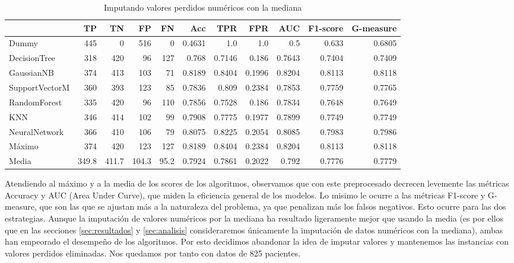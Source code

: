 \documentclass{article}
\begin{document}
\begin{table}[H]
\centering
\caption{Imputando valores perdidos numéricos con la mediana}
\label{tab:impute-median}
\begin{tabular}{|lrrrrrrrrrr|}
\hline
 & TP & TN & FP & FN & Acc & TPR & FPR & AUC & F1-score & G-measure\\ \hline
Dummy & 445 & 0 & 516 & 0 & 0.4631 & 1.0 & 1.0 & 0.5 & 0.633 & 0.6805\\
DecisionTree & 318 & 420 & 96 & 127 & 0.768 & 0.7146 & 0.186 & 0.7643 & 0.7404 & 0.7409\\
GaussianNB & 374 & 413 & 103 & 71 & 0.8189 & 0.8404 & 0.1996 & 0.8204 & 0.8113 & 0.8118\\
SupportVectorM & 360 & 393 & 123 & 85 & 0.7836 & 0.809 & 0.2384 & 0.7853 & 0.7759 & 0.7765\\
RandomForest & 335 & 420 & 96 & 110 & 0.7856 & 0.7528 & 0.186 & 0.7834 & 0.7648 & 0.7649\\
KNN & 346 & 414 & 102 & 99 & 0.7908 & 0.7775 & 0.1977 & 0.7899 & 0.7749 & 0.7749\\
NeuralNetwork & 366 & 410 & 106 & 79 & 0.8075 & 0.8225 & 0.2054 & 0.8085 & 0.7983 & 0.7986\\ \hline
Máximo & 374 & 420 & 123 & 127 & 0.8189 & 0.8404 & 0.2384 & 0.8204 & 0.8113 & 0.8118\\
Media & 349.8 & 411.7 & 104.3 & 95.2 & 0.7924 & 0.7861 & 0.2022 & 0.792 & 0.7776 & 0.7779\\
\hline
\end{tabular}
\end{table}

Atendiendo al máximo y a la media de los scores de los algoritmos,
observamos que con este preprocesado decrecen levemente las métricas
Accuracy y AUC (Area Under Curve), que miden la eficiencia general de
los modelos. Lo misimo le ocurre a las métricas F1-score y G-measure,
que son las que se ajustan más a la naturaleza del problema, ya que
penalizan más los falsos negativos. Esto ocurre para las dos
estrategias. Aunque la imputación de valores numéricos por la mediana
ha resultado ligeramente mejor que usando la media (es por ellos que
en las secciones \ref{sec:resultados} y \ref{sec:analisis}
consideraremos únicamente la imputación de datos numéricos con la
mediana), ambas han empeorado el desempeño de los algoritmos. Por esto
decidimos abandonar la idea de imputar valores y mantenemos las
instancias con valores perdidos eliminadas. Nos quedamos por tanto con
datos de 825 pacientes.
\end{document}
